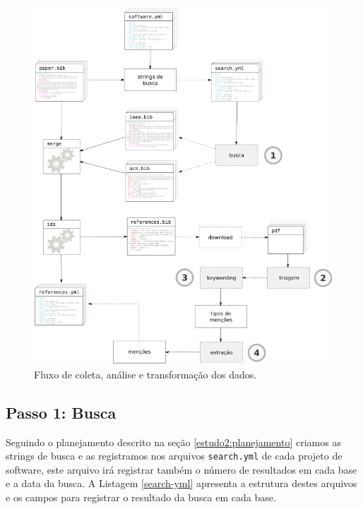 \begin{figure}[h]
  \center
  \includegraphics[scale=0.35]{imagens/estudo2-fluxograma.png}
  \caption{Fluxo de coleta, análise e transformação dos dados.}
  \label{estudo2-fluxograma}
\end{figure}


\subsection{Passo 1: Busca}

Seguindo o planejamento descrito na seção \ref{estudo2:planejamento} criamos as
strings de busca e as registramos nos arquivos \texttt{search.yml} de cada
projeto de software, este arquivo irá registrar também o número de resultados
em cada base e a data da busca. A Listagem \ref{search-yml} apresenta a
estrutura destes arquivos e os campos para registrar o resultado da busca em
cada base.

